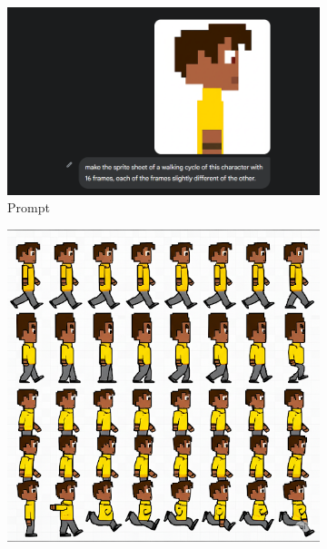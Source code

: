 \begin{figure}[htbp]
    \centering
    \caption{\small Processo da geração 2 do sprite sheet no Gemini Pro em julho/2025}
    \label{fig:geminiProSheet2}

    \begin{subfigure}{0.9\linewidth}
        \includegraphics[width=1\linewidth]{figs/geminiPro/chat8/tela2.PNG}
        \caption{\small Prompt}
        \label{fig:geminiProSheet2Prompt}
    \end{subfigure}
    \begin{subfigure}{0.3\linewidth}
        \includegraphics[width=1\linewidth]{figs/geminiPro/chat8/tela2_res1.PNG}

\end{subfigure}
\end{figure}
